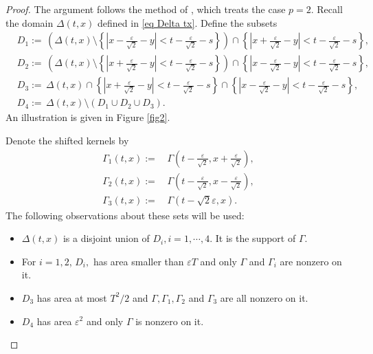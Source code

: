 \documentclass[11pt,reqno]{amsart}
\numberwithin{equation}{section}
\newcommand{\1}{{\bf 1}}
\newcommand{\2}{{\bf 2}}
\begin{document}
\begin{proof}  The argument follows the method of \cite[Lemma 5.1]{CL25}, which treats  the case  $p=2$. 
Recall the domain $\Delta(t, x)$ defined  in  \eqref{eq Delta tx}.     Define the subsets 
    \begin{equation}\label{eq Domain}
    \begin{split} 
    &  D_1:= \, \left( \Delta(t, x)\setminus \left\{\left|x-\frac{\varepsilon}{\sqrt{2}}-y\right|<t-\frac{\varepsilon}{\sqrt{2}}-s\right\}\right)\cap\left\{\left|x+\frac{\varepsilon}{\sqrt{2}}-y\right|<t-\frac{\varepsilon}{\sqrt{2}}-s\right\}, \\
      &   D_2:= \, \left( \Delta(t, x)\setminus \left\{\left|x+\frac{\varepsilon}{\sqrt{2}}-y\right|<t-\frac{\varepsilon}{\sqrt{2}}-s\right\}\right) \cap \left\{\left|x-\frac{\varepsilon}{\sqrt{2}}-y\right|<t-\frac{\varepsilon}{\sqrt{2}}-s\right\},\\
      &   D_{3}:=  \,  \Delta(t, x)\cap \left\{ \left|x+\frac{\varepsilon}{\sqrt{2}}-y\right|<t-\frac{\varepsilon}{\sqrt{2}}-s\right\} \cap \left\{\left|x-\frac{\varepsilon}{\sqrt{2}}-y\right|<t-\frac{\varepsilon}{\sqrt{2}}-s\right\},\\
    &  D_4:=  \,  \Delta(t, x)\setminus (D_1\cup D_2\cup D_{3}).
    \end{split}
    \end{equation}
    An illustration is given in Figure \ref{fig2}.

Denote the shifted kernels by 
   \begin{equation}
   \begin{split} 
    \Gamma_1(t, x):= &\, \Gamma\left(t-\frac{\varepsilon}{\sqrt{2}},x+\frac{\varepsilon}{\sqrt{2}}\right), \\
   \Gamma_2(t, x):=& \, \Gamma\left(t-\frac{\varepsilon}{\sqrt{2}}, x-\frac{\varepsilon}{\sqrt{2}}\right),  \\
 \Gamma_3(t, x):= & \, \Gamma\left(t-\sqrt{2}\varepsilon, x\right). 
   \end{split}
   \end{equation}
The following observations about these sets will be used:
    \begin{itemize}
        \item $\Delta(t, x)$ is a disjoint union of $D_i, i=1, \cdots, 4$.  It is the support of $\Gamma$.
                  \item For $i=1,2$,  $D_i, $ has area smaller than $\varepsilon  T$ and only $\Gamma$ and $\Gamma_i$ are nonzero on it. 
        \item $D_3$ has area  at most  $T^2/2$ and $\Gamma, \Gamma_1, \Gamma_2$ and $\Gamma_{3}$ are all nonzero on it.
         \item $D_4$ has area $\varepsilon^2$ and only $\Gamma$ is nonzero on it.
    \end{itemize}
    

\end{proof}
\end{document}
